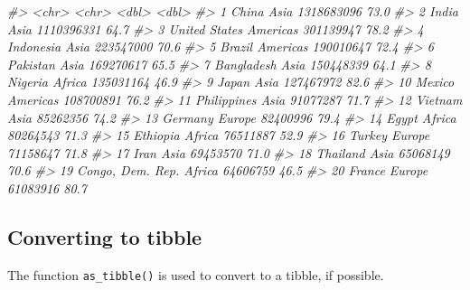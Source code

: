\documentclass[
]{book}
\newenvironment{Shaded}{\begin{snugshade}}{\end{snugshade}}
\newcommand{\CommentTok}[1]{\textcolor[rgb]{0.56,0.35,0.01}{\textit{#1}}}
\begin{document}
\begin{Shaded}
\begin{Highlighting}[]
\CommentTok{\#\textgreater{}    \textless{}chr\textgreater{}            \textless{}chr\textgreater{}          \textless{}dbl\textgreater{}          \textless{}dbl\textgreater{}}
\CommentTok{\#\textgreater{}  1 China            Asia      1318683096           73.0}
\CommentTok{\#\textgreater{}  2 India            Asia      1110396331           64.7}
\CommentTok{\#\textgreater{}  3 United States    Americas   301139947           78.2}
\CommentTok{\#\textgreater{}  4 Indonesia        Asia       223547000           70.6}
\CommentTok{\#\textgreater{}  5 Brazil           Americas   190010647           72.4}
\CommentTok{\#\textgreater{}  6 Pakistan         Asia       169270617           65.5}
\CommentTok{\#\textgreater{}  7 Bangladesh       Asia       150448339           64.1}
\CommentTok{\#\textgreater{}  8 Nigeria          Africa     135031164           46.9}
\CommentTok{\#\textgreater{}  9 Japan            Asia       127467972           82.6}
\CommentTok{\#\textgreater{} 10 Mexico           Americas   108700891           76.2}
\CommentTok{\#\textgreater{} 11 Philippines      Asia        91077287           71.7}
\CommentTok{\#\textgreater{} 12 Vietnam          Asia        85262356           74.2}
\CommentTok{\#\textgreater{} 13 Germany          Europe      82400996           79.4}
\CommentTok{\#\textgreater{} 14 Egypt            Africa      80264543           71.3}
\CommentTok{\#\textgreater{} 15 Ethiopia         Africa      76511887           52.9}
\CommentTok{\#\textgreater{} 16 Turkey           Europe      71158647           71.8}
\CommentTok{\#\textgreater{} 17 Iran             Asia        69453570           71.0}
\CommentTok{\#\textgreater{} 18 Thailand         Asia        65068149           70.6}
\CommentTok{\#\textgreater{} 19 Congo, Dem. Rep. Africa      64606759           46.5}
\CommentTok{\#\textgreater{} 20 France           Europe      61083916           80.7}
\end{Highlighting}
\end{Shaded}

\hypertarget{converting-to-tibble}{%
\subsection{Converting to tibble}\label{converting-to-tibble}}

The function \texttt{as\_tibble()} is used to convert to a tibble, if possible.
\end{document}
